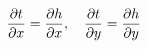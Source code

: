 \documentclass[preview]{standalone}
\begin{document}
\begin{align*}
\special{dvisvgm:raw <g id='unique000'>}\frac{\partial t}{\partial x} = \frac{\partial h}{\partial x}, \quad \frac{\partial t}{\partial y} = \frac{\partial h}{\partial y}\special{dvisvgm:raw </g>}
\end{align*}
\end{document}
